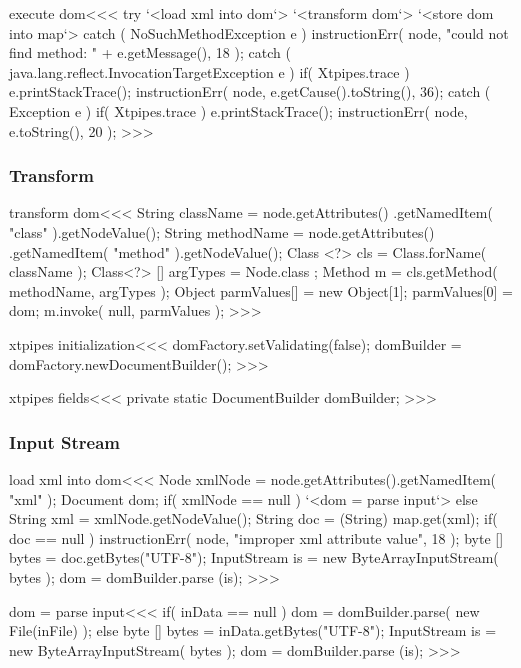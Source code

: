 \documentclass{article}
\begin{document}
{\<execute dom\><<<
try{ 
   `<load xml into dom`>
   `<transform dom`>
   `<store dom into map`>
} catch ( NoSuchMethodException e ){  
   instructionErr( node, 
       "could not find method: " + e.getMessage(), 18 );   
} catch ( java.lang.reflect.InvocationTargetException e ){
   if( Xtpipes.trace ){ e.printStackTrace(); }
   instructionErr( node, e.getCause().toString(), 36);
} catch ( Exception e ){  
   if( Xtpipes.trace ){ e.printStackTrace(); }
   instructionErr( node, e.toString(), 20 );   
} 
>>>



\subsubsection{Transform}


\<transform dom\><<<
String className = node.getAttributes()
             .getNamedItem( "class" ).getNodeValue();
String methodName = node.getAttributes()
             .getNamedItem( "method" ).getNodeValue();
Class <?> cls = Class.forName( className );
Class<?>  [] argTypes = { Node.class }; 
Method m = cls.getMethod( methodName, argTypes ); 
Object parmValues[] = new Object[1]; 
parmValues[0] = dom; 
m.invoke( null, parmValues ); 
>>>

\<xtpipes initialization\><<<
domFactory.setValidating(false);
domBuilder = domFactory.newDocumentBuilder();
>>>

\<xtpipes fields\><<<
private static DocumentBuilder domBuilder;
>>>



\subsubsection{Input Stream}


\<load xml into dom\><<<
Node xmlNode = node.getAttributes().getNamedItem( "xml" );
Document dom;
if( xmlNode == null ){
   `<dom = parse input`>
} else {
   String xml = xmlNode.getNodeValue();
   String doc = (String) map.get(xml);
   if( doc == null ){   
      instructionErr( node, "improper xml attribute value", 18 );   
   }
   byte [] bytes = doc.getBytes("UTF-8");
   InputStream is = new ByteArrayInputStream( bytes );
   dom = domBuilder.parse (is);
}  
>>>

\<dom = parse input\><<<
if( inData == null ){
   dom = domBuilder.parse( new File(inFile) );
} else {
   byte [] bytes = inData.getBytes("UTF-8");
   InputStream is =  new ByteArrayInputStream( bytes );
   dom = domBuilder.parse (is);}
>>>



}
\end{document}
